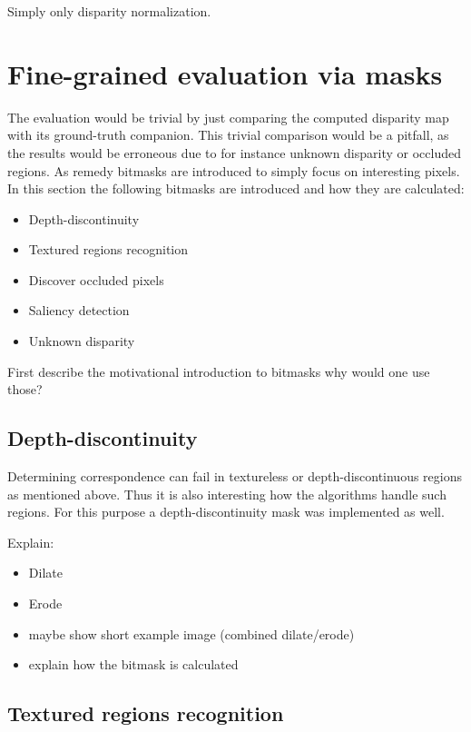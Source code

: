 Simply only disparity normalization.

\section{Fine-grained evaluation via masks}

The evaluation would be trivial by just comparing the computed disparity map with its ground-truth companion.
This trivial comparison would be a pitfall, as the results would be erroneous due to for instance unknown disparity or occluded regions.
As remedy bitmasks are introduced to simply focus on interesting pixels.
In this section the following bitmasks are introduced and how they are calculated:

\begin{itemize}
  \item Depth-discontinuity
  \item Textured regions recognition
  \item Discover occluded pixels
  \item Saliency detection
  \item Unknown disparity
\end{itemize}

First describe the motivational introduction to bitmasks why would one use those?

\subsection*{Depth-discontinuity}

Determining correspondence can fail in textureless or depth-discontinuous regions as mentioned above.
Thus it is also interesting how the algorithms handle such regions. For this purpose a depth-discontinuity mask was implemented as well.

Explain:

\begin{itemize}
  \item Dilate
  \item Erode
  \item maybe show short example image (combined dilate/erode)
  \item explain how the bitmask is calculated
\end{itemize}

\subsection*{Textured regions recognition}

